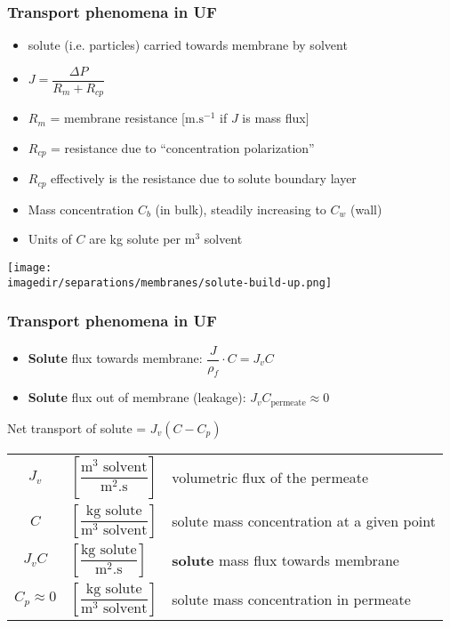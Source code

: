 \begin{frame}\frametitle{Transport phenomena in UF}
	\begin{itemize}
		\item	solute (i.e. particles) carried towards membrane by solvent
		\item	$J = \dfrac{\Delta P}{R_m + R_{cp}}$
		\item	$R_m$ = membrane resistance [$\text{m.s}^{-1}$ if $J$ is mass flux]
		\item	$R_{cp}$ = resistance due to ``concentration polarization''
		\item	$R_{cp}$ effectively is the resistance due to solute boundary layer
		\item	Mass concentration $C_b$ (in bulk), steadily increasing to $C_w$ (wall)
		\item	Units of $C$ are kg solute per m$^3$ solvent
	\end{itemize}
	\begin{center}
		\texttt{[image: \\imagedir/separations/membranes/solute-build-up.png]}
	\end{center}
\end{frame}

\begin{frame}\frametitle{Transport phenomena in UF}
	\begin{itemize}
		\item	\textbf{Solute} flux towards membrane: $\dfrac{J}{\rho_f}\cdot C = J_v C$
		\\
		\item	\textbf{Solute} flux out of membrane (leakage): $J_v C_\text{permeate} \approx 0$ 
	\end{itemize}
	\begin{exampleblock}{}
		Net transport of solute = $J_v(C - C_p)$
	\end{exampleblock}

	\begin{tabular}{cll}
		$J_v$		&	$\left[\dfrac{\text{m}^3 \text{~solvent}}{\text{m}^2 \text{.s}}\right]$	& volumetric flux of the permeate \\
		$C$ 		&  	$\left[\dfrac{\text{kg} \text{~solute}}{\text{m}^3 \text{~solvent}}\right]$	& solute mass concentration at a given point\\
		$J_v C$ 	&  	$\left[\dfrac{\text{kg} \text{~solute}}{\text{m}^2 \text{.s}}\right]$ & \textbf{solute} mass flux towards membrane\\
		$C_p \approx 0$ &  	$\left[\dfrac{\text{kg} \text{~solute}}{\text{m}^3 \text{~solvent}}\right]$	& solute mass concentration in permeate\\
	\end{tabular}
	\vfill
\end{frame}

